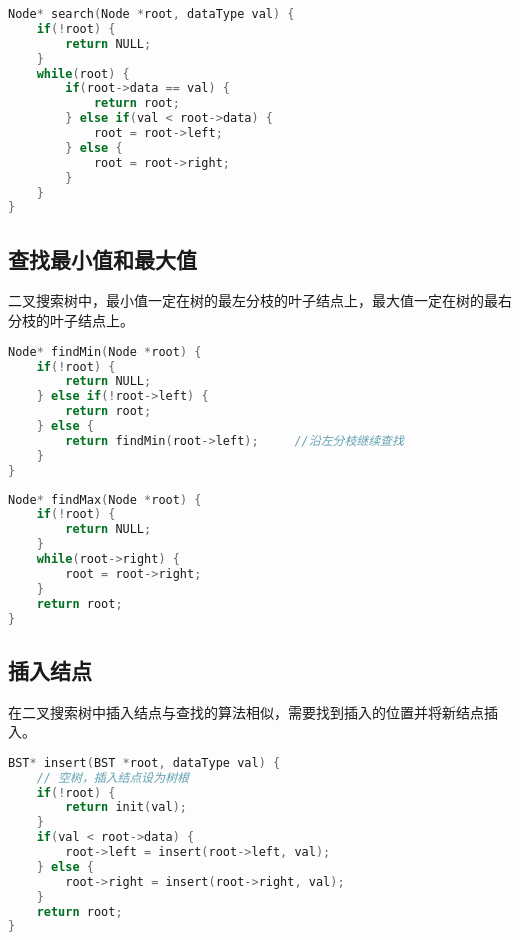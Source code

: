 \begin{lstlisting}[language=C]
Node* search(Node *root, dataType val) {
    if(!root) {
        return NULL;
    }  
    while(root) {
        if(root->data == val) {
            return root;
        } else if(val < root->data) {
            root = root->left;
        } else {
            root = root->right;
        }
    }
}
\end{lstlisting}

\subsection{查找最小值和最大值}

二叉搜索树中，最小值一定在树的最左分枝的叶子结点上，最大值一定在树的最右分枝的叶子结点上。 \\


\begin{lstlisting}[language=C]
Node* findMin(Node *root) {
    if(!root) {
        return NULL;
    } else if(!root->left) {
        return root;
    } else {
        return findMin(root->left);		//沿左分枝继续查找
    }
}
\end{lstlisting}

\vspace{0.5cm}


\begin{lstlisting}[language=C]
Node* findMax(Node *root) {
    if(!root) {
        return NULL;
    } 
    while(root->right) {
        root = root->right;
    }
    return root;
}
\end{lstlisting}

\subsection{插入结点}

在二叉搜索树中插入结点与查找的算法相似，需要找到插入的位置并将新结点插入。 \\


\begin{lstlisting}[language=C]
BST* insert(BST *root, dataType val) {
    // 空树，插入结点设为树根
    if(!root) {
        return init(val);
    }
    if(val < root->data) {
        root->left = insert(root->left, val);
    } else {
        root->right = insert(root->right, val);
    }
    return root;
}
\end{lstlisting}

